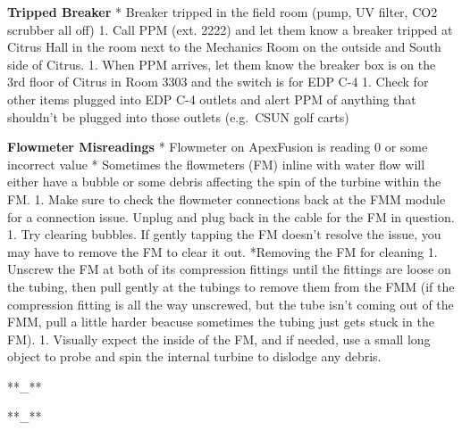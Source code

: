 \documentclass[]{book}
\begin{document}
 \textbf{Tripped Breaker} * Breaker tripped in the field room (pump, UV
filter, CO2 scrubber all off) 1. Call PPM (ext. 2222) and let them know
a breaker tripped at Citrus Hall in the room next to the Mechanics Room
on the outside and South side of Citrus. 1. When PPM arrives, let them
know the breaker box is on the 3rd floor of Citrus in Room 3303 and the
switch is for EDP C-4 1. Check for other items plugged into EDP C-4
outlets and alert PPM of anything that shouldn't be plugged into those
outlets (e.g.~CSUN golf carts)

 \textbf{Flowmeter Misreadings} * Flowmeter on ApexFusion is reading 0
or some incorrect value * Sometimes the flowmeters (FM) inline with
water flow will either have a bubble or some debris affecting the spin
of the turbine within the FM. 1. Make sure to check the flowmeter
connections back at the FMM module for a connection issue. Unplug and
plug back in the cable for the FM in question. 1. Try clearing bubbles.
If gently tapping the FM doesn't resolve the issue, you may have to
remove the FM to clear it out. *Removing the FM for cleaning 1. Unscrew
the FM at both of its compression fittings until the fittings are loose
on the tubing, then pull gently at the tubings to remove them from the
FMM (if the compression fitting is all the way unscrewed, but the tube
isn't coming out of the FMM, pull a little harder beacuse sometimes the
tubing just gets stuck in the FM). 1. Visually expect the inside of the
FM, and if needed, use a small long object to probe and spin the
internal turbine to dislodge any debris.

 **\_**

 **\_**


\end{document}
